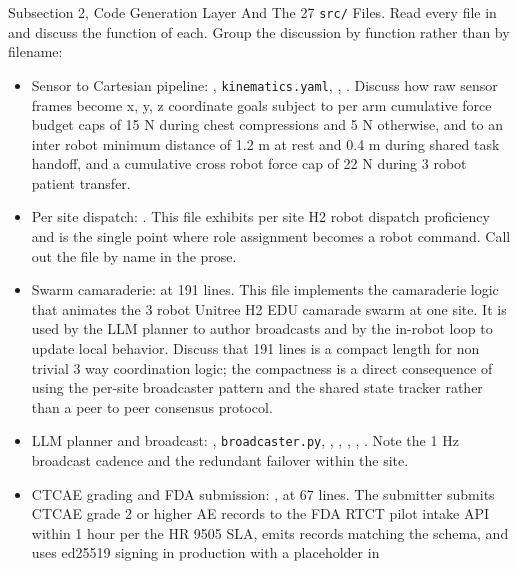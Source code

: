 \begin{sectionaccent}
Subsection 2, Code Generation Layer And The 27 \texttt{src/} Files.
Read every file in
 and discuss the
function of each. Group the discussion by function rather than by
filename:
\begin{itemize}
  \item Sensor to Cartesian pipeline: ,
        \texttt{kinematics.yaml}, ,
        . Discuss how raw sensor frames become
        x, y, z coordinate goals subject to per arm cumulative force
        budget caps of 15 N during chest compressions and 5 N
        otherwise, and to an inter robot minimum distance of 1.2 m at
        rest and 0.4 m during shared task handoff, and a cumulative
        cross robot force cap of 22 N during 3 robot patient
        transfer.
  \item Per site dispatch: . This file
        exhibits per site H2 robot dispatch proficiency and is the
        single point where role assignment becomes a robot command.
        Call out the file by name in the prose.
  \item Swarm camaraderie:  at 191 lines.
        This file implements the camaraderie logic that animates the
        3 robot Unitree H2 EDU camarade swarm at one site. It is used
        by the LLM planner to author broadcasts and by the in-robot
        loop to update local behavior. Discuss that 191 lines is a
        compact length for non trivial 3 way coordination logic; the
        compactness is a direct consequence of using the per-site
        broadcaster pattern and the shared state tracker rather than
        a peer to peer consensus protocol.
  \item LLM planner and broadcast: ,
        \texttt{broadcaster.py}, ,
        , ,
        , .
        Note the 1 Hz broadcast cadence and the redundant failover
        within the site.
  \item CTCAE grading and FDA submission:
        ,
         at 67 lines. The submitter
        submits CTCAE grade 2 or higher AE records to the FDA RTCT
        pilot intake API within 1 hour per the HR 9505 SLA, emits
        records matching the  schema,
        and uses ed25519 signing in production with a placeholder in

\end{itemize}
\end{sectionaccent}
